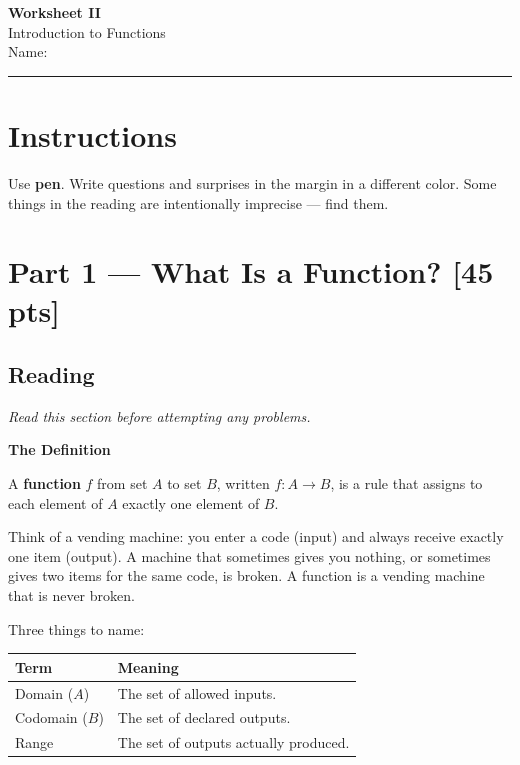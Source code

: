 \documentclass[12pt]{article}
\begin{document}
\pagestyle{fancy}

\begin{center}
  {\Large\bfseries Worksheet II}\\[4pt]
  Introduction to Functions\\[6pt]
  Name:\;\underline{\hspace{6.5cm}}\quad
\end{center}
\hrule\bigskip

\section*{Instructions}

Use \textbf{pen}. Write questions and surprises in the margin in a different color.
Some things in the reading are intentionally imprecise --- find them.

\section*{Part 1 --- What Is a Function? \hfill [45 pts]}

\subsection*{Reading}

\textit{Read this section before attempting any problems.}

\bigskip
\noindent\textbf{The Definition}

A \textbf{function} $f$ from set $A$ to set $B$, written $f\colon A \to B$,
is a rule that assigns to each element of $A$ exactly one element of $B$.

Think of a vending machine: you enter a code (input) and always receive exactly one
item (output). A machine that sometimes gives you nothing, or sometimes gives two items
for the same code, is broken. A function is a vending machine that is never broken.

Three things to name:

\medskip
\begin{center}
\renewcommand{\arraystretch}{1.6}
\begin{tabular}{@{} p{3cm} p{9cm} @{}}
\toprule
\textbf{Term} & \textbf{Meaning} \\
\midrule
Domain ($A$)    & The set of allowed inputs. \\
Codomain ($B$)  & The set of declared outputs. \\
Range           & The set of outputs actually produced. \\
\bottomrule
\end{tabular}
\renewcommand{\arraystretch}{1}
\end{center}
\end{document}
